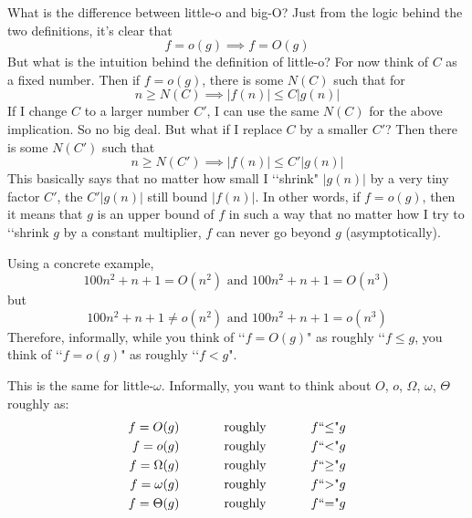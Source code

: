 What is the difference between little-o and big-O?
Just from the logic behind the two definitions, it's clear that
\[
f = o(g) \implies f = O(g)
\]
But what is the intuition behind the definition of little-o?
For now think of $C$ as a fixed number.
Then if $f = o(g)$, there is some $N(C)$ such that for
\[
n \geq N(C) \implies |f(n)| \leq C|g(n)|
\]
If I change $C$ to a larger number $C'$, I can use the same $N(C)$
for the above implication.
So no big deal.
But what if I replace $C$ by a smaller $C'$?
Then there is some $N(C')$ such that
\[
n \geq N(C') \implies |f(n)| \leq C'|g(n)|
\]
This basically says that no matter how small I \lq\lq shrink" $|g(n)|$
by a very tiny factor $C'$, the $C'|g(n)|$ still bound
$|f(n)|$.
In other words, if $f = o(g)$, then it means that
$g$ is an upper bound of $f$ in such a
way that no matter how I try to \lq\lq shrink $g$ by a constant
multiplier, $f$ can never go beyond $g$ (asymptotically).

Using a concrete example,
\[
100n^2 + n + 1 = O(n^2) \text{ and } 100n^2 + n + 1 = O(n^3)
\]
but
\[
100n^2 + n + 1 \neq o(n^2) \text{ and } 100n^2 + n + 1 = o(n^3)
\]
Therefore, informally, while you think of \lq\lq $f = O(g)$" as
roughly \lq\lq $f \leq g$, you think of \lq\lq $f = o(g)$"
as roughly \lq\lq $f < g$".

This is the same for little-$\omega$.
Informally, you want to think about $O$, $o$, $\Omega$, $\omega$, $\Theta$ roughly as:
\begin{align*}
f = O(g)      &\text{ \hspace{1cm} roughly \hspace{1cm} } f \text{\lq\lq$\leq$"} g \\
f = o(g)      &\text{ \hspace{1cm} roughly \hspace{1cm} } f \text{\lq\lq$<$"} g \\
f = \Omega(g) &\text{ \hspace{1cm} roughly \hspace{1cm} } f \text{\lq\lq$\geq$"} g \\
f = \omega(g) &\text{ \hspace{1cm} roughly \hspace{1cm} } f \text{\lq\lq$>$"} g \\
f = \Theta(g) &\text{ \hspace{1cm} roughly \hspace{1cm} } f \text{\lq\lq$=$"} g \\
\end{align*}

